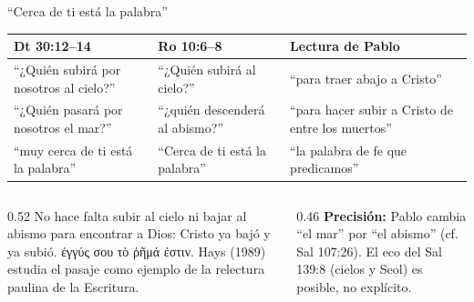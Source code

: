 \documentclass[hyperref={bookmarks=false},aspectratio=169]{beamer}
\newcommand{\grc}[1]{\foreignlanguage{ancientgreek}{#1}}
\newcommand{\precision}[1]{{\footnotesize\color{gris}\textbf{Precisión:} #1}}
\begin{document}
\begin{frame}{``Cerca de ti está la palabra''}
\scriptsize\renewcommand{\arraystretch}{1.18}
\begin{tabular}{@{}>{\RaggedRight\arraybackslash}p{3.9cm}>{\RaggedRight\arraybackslash}p{3.7cm}>{\RaggedRight\arraybackslash}p{4.2cm}@{}}
\toprule
\textbf{Dt 30:12--14} & \textbf{Ro 10:6--8} & \textbf{Lectura de Pablo} \\ \midrule
``¿Quién subirá por nosotros al cielo?'' & ``¿Quién subirá al cielo?'' & ``para traer abajo a Cristo'' \\
``¿Quién pasará por nosotros el mar?'' & ``¿quién descenderá al abismo?'' & ``para hacer subir a Cristo de entre los muertos'' \\
``muy cerca de ti está la palabra'' & ``Cerca de ti está la palabra'' & ``la palabra de fe que predicamos'' \\
\bottomrule
\end{tabular}\par\medskip
\begin{columns}[t,onlytextwidth]
\begin{column}{0.52\textwidth}\small
No hace falta subir al cielo ni bajar al abismo para encontrar a Dios: Cristo ya bajó y ya subió. \grc{ἐγγύς σου τὸ ῥῆμά ἐστιν}. Hays (1989) estudia el pasaje como ejemplo de la relectura paulina de la Escritura.
\end{column}
\begin{column}{0.46\textwidth}
\precision{Pablo cambia ``el mar'' por ``el abismo'' (cf. Sal 107:26). El eco del Sal 139:8 (cielos y Seol) es posible, no explícito.}
\end{column}
\end{columns}
\end{frame}
\end{document}
